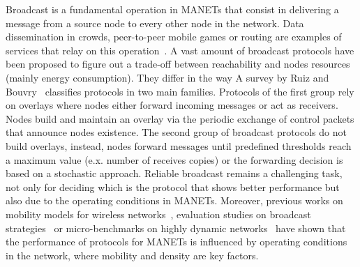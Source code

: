 Broadcast is a fundamental operation in MANETs that consist in delivering a message from a source node to every other node in the network.
%
Data dissemination in crowds, peer-to-peer mobile games or routing are examples of services that relay on this operation~\cite{overview_adhoc_networks}.
%
A vast amount of broadcast protocols have been proposed to figure out a trade-off between reachability and nodes resources (mainly energy consumption).
%
They differ in the way 
%
A survey by Ruiz and Bouvry~\cite{SurveyRuiz} classifies protocols in two main families.
%
Protocols of the first group rely on overlays where nodes either forward incoming messages or act as receivers. 
%
Nodes build and maintain an overlay via the periodic exchange of control packets that announce nodes existence. 
%
The second group of broadcast protocols do not build overlays, instead, nodes forward messages until predefined thresholds reach a maximum value (e.x. number of receives copies) or the forwarding decision is based on a stochastic approach. 
%
Reliable broadcast remains a challenging task, not only for deciding which is the protocol that shows better performance but also due to the operating conditions in MANETs.
%
Moreover, previous works on mobility models for wireless networks~\cite{bai2004mobility, ChaintreauA2006}, evaluation studies on broadcast strategies~\cite{DensityMobDrivenEval, graph-mob-model_Sholz2005} or micro-benchmarks on highly dynamic networks~\cite{adaptive_group_com_iscc02, ObraczkaK_2001} have shown that the performance of protocols for MANETs is influenced by operating conditions in the network, where mobility and density are key factors.


